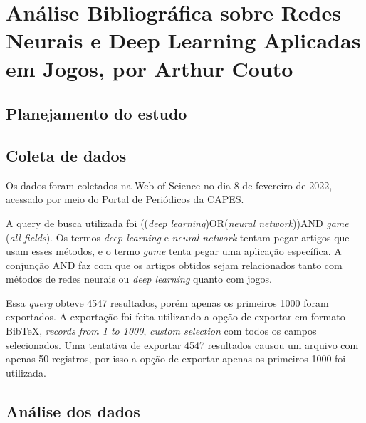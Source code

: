 \chapter{Análise Bibliográfica sobre Redes Neurais e Deep Learning Aplicadas em Jogos, por Arthur Couto\label{chap:bibliometria:CrimsonCrown}}

\section{Planejamento do estudo}

\section{Coleta de dados}
Os dados foram coletados na Web of Science no dia 8 de fevereiro de 2022, acessado por meio do Portal de Periódicos da CAPES.

A query de busca utilizada foi ((\textit{deep learning})OR(\textit{neural network}))AND \textit{game} (\textit{all fields}). Os termos \textit{deep learning} e \textit{neural network} tentam pegar artigos que usam esses métodos, e o termo \textit{game} tenta pegar uma aplicação específica. A conjunção AND faz com que os artigos obtidos sejam relacionados tanto com métodos de redes neurais ou \textit{deep learning} quanto com jogos.

Essa \textit{query} obteve 4547 resultados, porém apenas os primeiros 1000 foram exportados. A exportação foi feita utilizando a opção de exportar em formato BibTeX, \textit{records from 1 to 1000}, \textit{custom selection} com todos os campos selecionados. Uma tentativa de exportar 4547 resultados causou um arquivo com apenas 50 registros, por isso a opção de exportar apenas os primeiros 1000 foi utilizada.

\section{Análise dos dados}